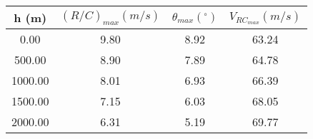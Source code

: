 \begin{tabular}{|cccc|} \hline 
h (m) & $(R/C)_{max} (m/s)$ & $\theta_{max} (^\circ)$ & $V_{RC_{max}} (m/s)$  \\ \hline 
    0.00 &     9.80 &     8.92 &    63.24 \\ 
  500.00 &     8.90 &     7.89 &    64.78 \\ 
 1000.00 &     8.01 &     6.93 &    66.39 \\ 
 1500.00 &     7.15 &     6.03 &    68.05 \\ 
 2000.00 &     6.31 &     5.19 &    69.77 \\ \hline 
\end{tabular}
